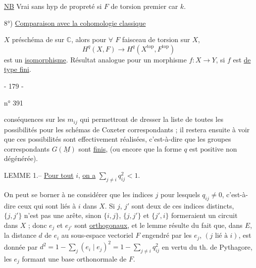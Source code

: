 \uline{NB} Vrai sans hyp de propreté si $F$ de torsion premier  car $k$.

8°) \uline{Comparaison avec la cohomologie classique}

$X$ préschéma de  sur $\mathbb C$, alors pour $\forall$ $F$ faisceau de torsion sur $X$,
\[
H^q(X,F)\longrightarrow H^q(X^{\mathrm{top}},F^{\mathrm{top}})
\]
est un \uline{isomorphisme}. Résultat analogue pour un morphisme $f:X\longrightarrow Y$, si $f$ est  \uline{de type fini}.




\begin{center}- 179 -\end{center}
\hfill n° 391

conséquences sur les $m_{ij}$ qui permettront de dresser la liste de toutes les possibilités pour les schémas de Coxeter correspondants ; il restera ensuite à voir que ces possibilités sont effectivement réalisées, c'est-à-dire que les groupes correspondants $G(\underline M)$ sont \uline{finis}, (ou encore que la forme $q$ est positive non dégénérée).

LEMME 1.-- \uline{Pour tout} $i$, \uline{on a} $\sum_{j\ne i}q_{ij}^2<1$.

On peut se borner à ne considérer que les indices $j$ pour lesquels $q_{ij}\ne0$, c'est-à-dire ceux qui sont liés à $i$ dans $X$. Si $j$, $j'$ sont deux de ces indices distincts, $\{j,j'\}$ n'est pas une arête, sinon $\{i,j\}$, $\{j,j'\}$ et $\{j',i\}$ formeraient un circuit dans $X$ ; donc $e_j$ et $e_{j'}$ sont \uline{orthogonaux}, et le lemme résulte du fait que, dans $E$, la distance $d$ de $e_i$ au sous-espace vectoriel $F$ engendré par les $e_j$, $(j\text{ lié à }i)$, est donnée par $d^2=1-\sum_j(e_i\mid e_j)^2=1-\sum_{j\ne i}q_{ij}^2$ en vertu du th. de Pythagore, les $e_j$ formant une base orthonormale de $F$.

